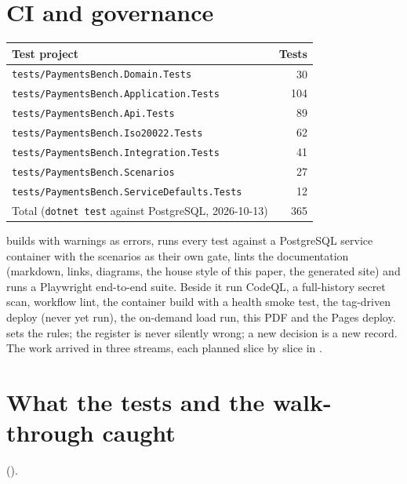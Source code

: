 \documentclass[11pt,a4paper]{article}
\begin{document}
\section{CI and governance}

\begin{center}
\begin{tabular}{@{}lr@{}}
\toprule
Test project & Tests \\
\midrule
\texttt{tests/PaymentsBench.Domain.Tests} & 30 \\
\texttt{tests/PaymentsBench.Application.Tests} & 104 \\
\texttt{tests/PaymentsBench.Api.Tests} & 89 \\
\texttt{tests/PaymentsBench.Iso20022.Tests} & 62 \\
\texttt{tests/PaymentsBench.Integration.Tests} & 41 \\
\texttt{tests/PaymentsBench.Scenarios} & 27 \\
\texttt{tests/PaymentsBench.ServiceDefaults.Tests} & 12 \\
\midrule
Total (\texttt{dotnet test} against PostgreSQL, 2026-10-13) & 365 \\
\bottomrule
\end{tabular}
\end{center}

 builds with warnings as errors, runs every test against a
PostgreSQL service container with the scenarios as their own gate, lints the documentation
(markdown, links, diagrams, the house style of this paper, the generated site) and runs a
Playwright end-to-end suite. Beside it run CodeQL, a full-history secret scan, workflow lint, the
container build with a health smoke test, the tag-driven deploy (never yet run), the on-demand load
run, this PDF and the Pages deploy.  sets the rules; the register is never
silently wrong; a new decision is a new record. The work arrived in three streams, each planned
slice by slice in .

\section{What the tests and the walk-through caught}\label{sec:caught}

().
\end{document}
